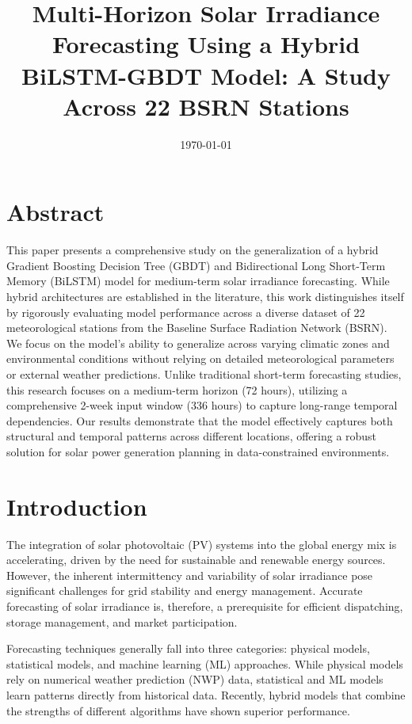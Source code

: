 \documentclass{article}
\title{Multi-Horizon Solar Irradiance Forecasting Using a Hybrid BiLSTM-GBDT Model: A Study Across 22 BSRN Stations}
\date{\today}
\begin{document}
\maketitle

\section{Abstract}
This paper presents a comprehensive study on the generalization of a hybrid Gradient Boosting Decision Tree (GBDT) and Bidirectional Long Short-Term Memory (BiLSTM) model for medium-term solar irradiance forecasting. While hybrid architectures are established in the literature, this work distinguishes itself by rigorously evaluating model performance across a diverse dataset of 22 meteorological stations from the Baseline Surface Radiation Network (BSRN). We focus on the model's ability to generalize across varying climatic zones and environmental conditions without relying on detailed meteorological parameters or external weather predictions. Unlike traditional short-term forecasting studies, this research focuses on a medium-term horizon (72 hours), utilizing a comprehensive 2-week input window (336 hours) to capture long-range temporal dependencies. Our results demonstrate that the model effectively captures both structural and temporal patterns across different locations, offering a robust solution for solar power generation planning in data-constrained environments.

\section{Introduction}
The integration of solar photovoltaic (PV) systems into the global energy mix is accelerating, driven by the need for sustainable and renewable energy sources. However, the inherent intermittency and variability of solar irradiance pose significant challenges for grid stability and energy management. Accurate forecasting of solar irradiance is, therefore, a prerequisite for efficient dispatching, storage management, and market participation.

Forecasting techniques generally fall into three categories: physical models, statistical models, and machine learning (ML) approaches. While physical models rely on numerical weather prediction (NWP) data, statistical and ML models learn patterns directly from historical data. Recently, hybrid models that combine the strengths of different algorithms have shown superior performance.
\end{document}
